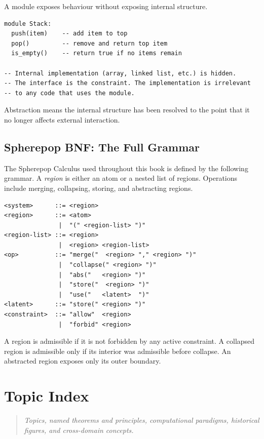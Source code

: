 \documentclass[11pt]{book}
\theoremstyle{plain}
\theoremstyle{definition}
\theoremstyle{remark}
\begin{document}
A module exposes behaviour without exposing internal structure.

\begin{verbatim}
module Stack:
  push(item)    -- add item to top
  pop()         -- remove and return top item
  is_empty()    -- return true if no items remain

-- Internal implementation (array, linked list, etc.) is hidden.
-- The interface is the constraint. The implementation is irrelevant
-- to any code that uses the module.
\end{verbatim}

Abstraction means the internal structure has been resolved to the point
that it no longer affects external interaction.

\section*{Spherepop BNF: The Full Grammar}

The Spherepop Calculus used throughout this book is defined by the
following grammar. A \emph{region} is either an atom or a nested list
of regions. Operations include merging, collapsing, storing, and
abstracting regions.

\begin{verbatim}
<system>      ::= <region>
<region>      ::= <atom>
               |  "(" <region-list> ")"
<region-list> ::= <region>
               |  <region> <region-list>
<op>          ::= "merge("  <region> "," <region> ")"
               |  "collapse(" <region> ")"
               |  "abs("   <region> ")"
               |  "store("  <region> ")"
               |  "use("   <latent>  ")"
<latent>      ::= "store(" <region> ")"
<constraint>  ::= "allow"  <region>
               |  "forbid" <region>
\end{verbatim}

A region is admissible if it is not forbidden by any active constraint.
A collapsed region is admissible only if its interior was admissible
before collapse. An abstracted region exposes only its outer boundary.

\chapter*{Topic Index}

\begin{quote}\small
\textit{Topics, named theorems and principles, computational paradigms,
historical figures, and cross-domain concepts.}
\end{quote}
\end{document}
